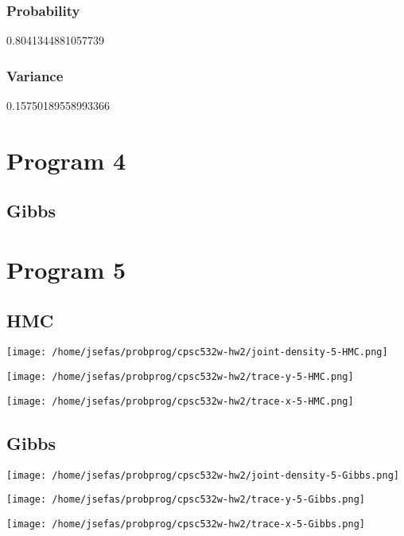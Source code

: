 \documentclass[11pt]{article}
\begin{document}
\subsubsection*{Probability}
\label{sec:org2196cc9}
0.8041344881057739
\subsubsection*{Variance}
\label{sec:org2c9ffc0}
0.15750189558993366


\section*{Program 4}
\label{sec:org7e79bed}
\subsection*{Gibbs}
\label{sec:org7050a10}

\section*{Program 5}
\label{sec:orgb4dc8cb}
\subsection*{HMC}
\label{sec:org172406f}
\begin{center}
\texttt{[image: /home/jsefas/probprog/cpsc532w-hw2/joint-density-5-HMC.png]}
\end{center}
\begin{center}
\texttt{[image: /home/jsefas/probprog/cpsc532w-hw2/trace-y-5-HMC.png]}
\end{center}
\begin{center}
\texttt{[image: /home/jsefas/probprog/cpsc532w-hw2/trace-x-5-HMC.png]}
\end{center}

\subsection*{Gibbs}
\label{sec:org9a7b8d4}
\begin{center}
\texttt{[image: /home/jsefas/probprog/cpsc532w-hw2/joint-density-5-Gibbs.png]}
\end{center}
\begin{center}
\texttt{[image: /home/jsefas/probprog/cpsc532w-hw2/trace-y-5-Gibbs.png]}
\end{center}
\begin{center}
\texttt{[image: /home/jsefas/probprog/cpsc532w-hw2/trace-x-5-Gibbs.png]}
\end{center}
\end{document}
